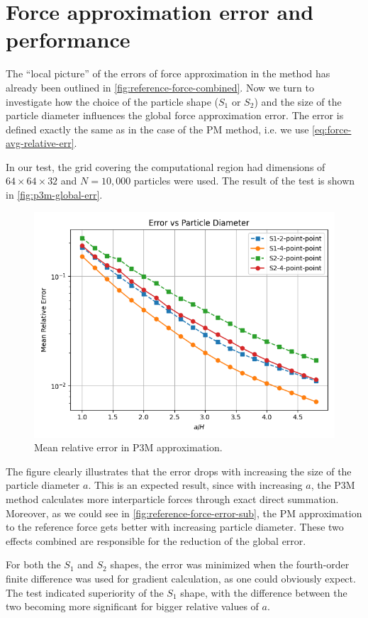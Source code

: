 \section{Force approximation error and performance}
The ``local picture'' of the errors of force approximation in the \PThreeM{} method has already been outlined in \autoref{fig:reference-force-combined}.
Now we turn to investigate how the choice of the particle shape ($S_1$ or $S_2$) and the size of the particle diameter influences the global force approximation error.
The error is defined exactly the same as in the case of the PM method, i.e. we use \autoref{eq:force-avg-relative-err}.

In our test, the grid covering the computational region had dimensions of $64\times 64\times 32$ and $N=10{,}000$ particles were used.
The result of the test is shown in \autoref{fig:p3m-global-err}.
\begin{figure}[htp]
    \centering
    \includegraphics[scale=0.5]{img/err_vs_part_diam_p3m.png}
    \caption{Mean relative error in P3M approximation.}
    \label{fig:p3m-global-err}
\end{figure}
The figure clearly illustrates that the error drops with increasing the size of the particle diameter $a$.
This is an expected result, since with increasing $a$, the P3M method calculates more interparticle forces through exact direct summation.
Moreover, as we could see in \autoref{fig:reference-force-error-sub}, the PM approximation to the reference force gets better with increasing particle diameter.
These two effects combined are responsible for the reduction of the global error.

For both the $S_1$ and $S_2$ shapes, the error was minimized when the fourth-order finite difference was used for gradient calculation, as one could obviously expect.
The test indicated superiority of the $S_1$ shape, with the difference between the two becoming more significant for bigger relative values of $a$.